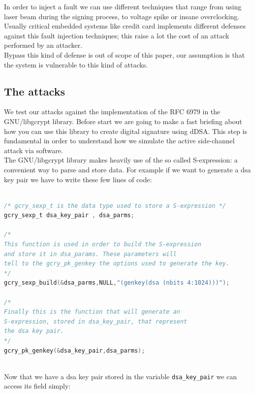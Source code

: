 \documentclass[11pt,english]{article}
\begin{document}
In order to inject a fault we can use different techniques that range from using laser beam during the signing process, to voltage spike or insane overclocking.
\\Usually critical embedded systems like credit card implements different defenses against this fault injection techniques; this raise a lot the cost of an attack performed by an attacker. \\Bypass this kind of defense is out of scope of this paper, our assumption is that the system is vulnerable to this kind of attacks.

\subsection{The attacks}

We test our attacks against the implementation of the RFC 6979\cite{rfc} in the GNU/libgcrypt library\cite{lib}. 
Before start we are going to make a fast briefing about how you can use this library to create digital signature using dDSA. This step is fundamental in order to understand how we simulate the active side-channel attack via software.\\
The GNU/libgcrypt library\cite{lib} makes heavily use of the so called S-expression\cite{sexp}: a convenient way to parse and store data. For example if we want to generate a dsa key pair we have to write these few lines of code:

\begin{lstlisting}[language=c]

/* gcry_sexp_t is the data type used to store a S-expression */
gcry_sexp_t dsa_key_pair , dsa_parms;

/* 
This function is used in order to build the S-expression 
and store it in dsa_params. These parameters will
tell to the gcry_pk_genkey the options used to generate the key.
*/
gcry_sexp_build(&dsa_parms,NULL,"(genkey(dsa (nbits 4:1024)))");

/*
Finally this is the function that will generate an 
S-expression, stored in dsa_key_pair, that represent 
the dsa key pair.
*/
gcry_pk_genkey(&dsa_key_pair,dsa_parms);
  
\end{lstlisting}

Now that we have a dsa key pair stored in the variable \texttt{dsa\_key\_pair} we can access its field simply:
\end{document}
